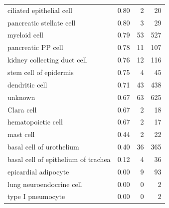 \begin{table}[pht!]
\begin{tabular}{lrrr}
  ciliated epithelial cell & 0.80 &   2 &  20 \\ 
  pancreatic stellate cell & 0.80 &   3 &  29 \\ 
  myeloid cell & 0.79 &  53 & 527 \\ 
  pancreatic PP cell & 0.78 &  11 & 107 \\ 
  kidney collecting duct cell & 0.76 &  12 & 116 \\ 
  stem cell of epidermis & 0.75 &   4 &  45 \\ 
  dendritic cell & 0.71 &  43 & 438 \\ 
  unknown & 0.67 &  63 & 625 \\ 
  Clara cell & 0.67 &   2 &  18 \\ 
  hematopoietic cell & 0.67 &   2 &  17 \\ 
  mast cell & 0.44 &   2 &  22 \\ 
  basal cell of urothelium & 0.40 &  36 & 365 \\ 
  basal cell of epithelium of trachea & 0.12 &   4 &  36 \\ 
  epicardial adipocyte & 0.00 &   9 &  93 \\ 
  lung neuroendocrine cell & 0.00 &   0 &   2 \\ 
  type I pneumocyte & 0.00 &   0 &   2 \\ 
   \bottomrule
\end{tabular}
\end{table}

